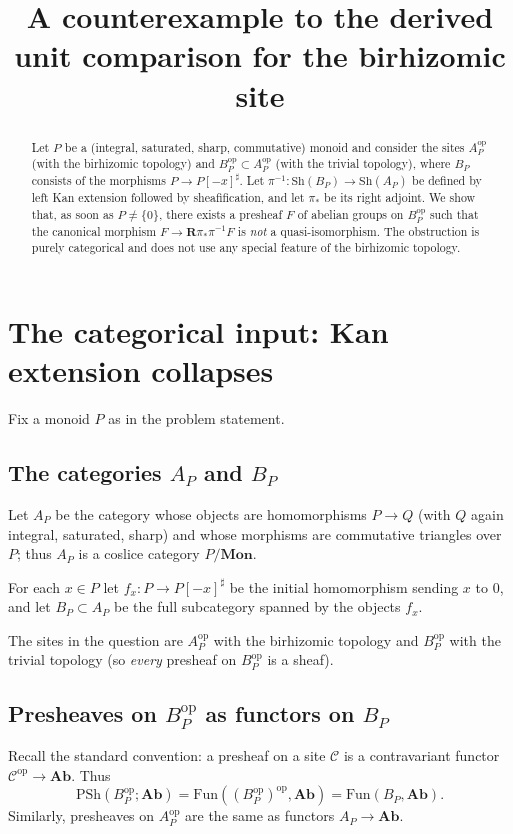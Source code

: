 \documentclass[11pt]{article}
\title{A counterexample to the derived unit comparison for the birhizomic site}
\author{}
\date{}
\theoremstyle{remark}
\begin{document}
\maketitle

\begin{abstract}
Let $P$ be a (integral, saturated, sharp, commutative) monoid and consider the sites
$A_P^{\mathrm{op}}$ (with the birhizomic topology) and $B_P^{\mathrm{op}}\subset A_P^{\mathrm{op}}$
(with the trivial topology), where $B_P$ consists of the morphisms $P\to P[-x]^\sharp$.
Let $\pi^{-1}\colon \mathrm{Sh}(B_P)\to \mathrm{Sh}(A_P)$ be defined by left Kan extension
followed by sheafification, and let $\pi_*$ be its right adjoint.
We show that, as soon as $P\neq\{0\}$, there exists a presheaf $F$ of abelian groups on
$B_P^{\mathrm{op}}$ such that the canonical morphism
$F\to \mathbf{R}\pi_*\pi^{-1}F$ is \emph{not} a quasi-isomorphism. The obstruction is
purely categorical and does not use any special feature of the birhizomic topology.
\end{abstract}

\section{The categorical input: Kan extension collapses}

Fix a monoid $P$ as in the problem statement.

\subsection*{The categories $A_P$ and $B_P$}
Let $A_P$ be the category whose objects are homomorphisms $P\to Q$ (with $Q$ again integral,
saturated, sharp) and whose morphisms are commutative triangles over $P$; thus $A_P$ is a
coslice category $P/\mathbf{Mon}$.

For each $x\in P$ let $f_x\colon P\to P[-x]^\sharp$ be the initial homomorphism sending $x$
to $0$, and let $B_P\subset A_P$ be the full subcategory spanned by the objects $f_x$.

The sites in the question are $A_P^{\mathrm{op}}$ with the birhizomic topology and
$B_P^{\mathrm{op}}$ with the trivial topology (so \emph{every} presheaf on $B_P^{\mathrm{op}}$
is a sheaf).

\subsection*{Presheaves on $B_P^{\mathrm{op}}$ as functors on $B_P$}
Recall the standard convention: a presheaf on a site $\mathcal{C}$ is a contravariant functor
$\mathcal{C}^{\mathrm{op}}\to \mathbf{Ab}$. Thus
\[
\mathrm{PSh}(B_P^{\mathrm{op}};\mathbf{Ab})=\mathrm{Fun}((B_P^{\mathrm{op}})^{\mathrm{op}},\mathbf{Ab})
=\mathrm{Fun}(B_P,\mathbf{Ab}).
\]
Similarly, presheaves on $A_P^{\mathrm{op}}$ are the same as functors $A_P\to\mathbf{Ab}$.
\end{document}
